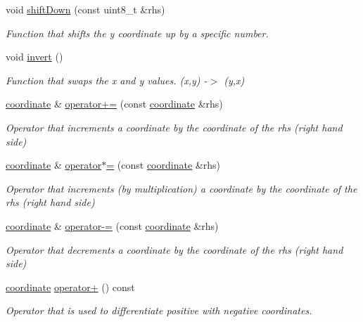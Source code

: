 \begin{DoxyCompactItemize}
void \hyperlink{classcoordinate_ae93ac2c7bceab17c68d3b4602165953b}{shift\+Down} (const uint8\+\_\+t \&rhs)
\begin{DoxyCompactList}\small\item\em Function that shifts the y coordinate up by a specific number. \end{DoxyCompactList}\item 
\mbox{\label{classcoordinate_aa59579c4ef2f53e69329d522031ca259}} 
void \hyperlink{classcoordinate_aa59579c4ef2f53e69329d522031ca259}{invert} ()
\begin{DoxyCompactList}\small\item\em Function that swaps the x and y values.  (x,y) -\/$>$ (y,x) \end{DoxyCompactList}\item 
\hyperlink{classcoordinate}{coordinate} \& \hyperlink{classcoordinate_a8c842f84e51d6a8509f22a159aeed8a2}{operator+=} (const \hyperlink{classcoordinate}{coordinate} \&rhs)
\begin{DoxyCompactList}\small\item\em Operator that increments a coordinate by the coordinate of the rhs (right hand side) \end{DoxyCompactList}\item 
\hyperlink{classcoordinate}{coordinate} \& \hyperlink{classcoordinate_a676a8c7cc88af2315fcf14e1bfb1403e}{operator$\ast$=} (const \hyperlink{classcoordinate}{coordinate} \&rhs)
\begin{DoxyCompactList}\small\item\em Operator that increments (by multiplication) a coordinate by the coordinate of the rhs (right hand side) \end{DoxyCompactList}\item 
\hyperlink{classcoordinate}{coordinate} \& \hyperlink{classcoordinate_a0658bdeb9f68f6c5adc0608bc56966cb}{operator-\/=} (const \hyperlink{classcoordinate}{coordinate} \&rhs)
\begin{DoxyCompactList}\small\item\em Operator that decrements a coordinate by the coordinate of the rhs (right hand side) \end{DoxyCompactList}\item 
\hyperlink{classcoordinate}{coordinate} \hyperlink{classcoordinate_ae2a84b442393f7f9aa7894b904f8ca86}{operator+} () const
\begin{DoxyCompactList}\small\item\em Operator that is used to differentiate positive with negative coordinates. \end{DoxyCompactList}\item 

\end{DoxyCompactItemize}
